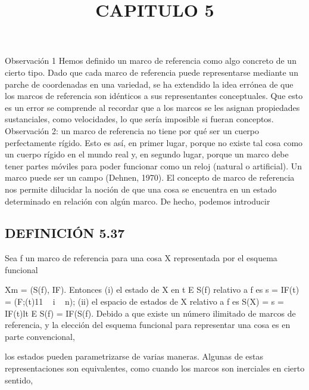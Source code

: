 \begin{justifying}
 \title{
   \begin{center}
    \normalsize CAPITULO 5
    \vspace{0.5cm}
   \end{center}  
  }

  \begin{justifying}
    Observación 1 Hemos definido un marco de referencia como algo concreto de un
cierto tipo. Dado que cada marco de referencia puede representarse mediante un
parche de coordenadas en una variedad, se ha extendido la idea errónea de que
los marcos de referencia son idénticos a sus representantes conceptuales.
Que esto es un error se comprende al recordar que a los marcos se les asignan
propiedades sustanciales, como velocidades, lo que sería imposible si
fueran conceptos. Observación 2: un marco de referencia no tiene por qué ser un
cuerpo perfectamente rígido. Esto es así, en primer lugar, porque no existe tal cosa como un
cuerpo rígido en el mundo real y, en segundo lugar, porque un marco debe tener
partes móviles para poder funcionar como un reloj (natural o artificial). Un
marco puede ser un campo (Dehnen, 1970).
El concepto de marco de referencia nos permite dilucidar la noción de que una
cosa se encuentra en un estado determinado en relación con algún marco. De hecho, podemos
introducir

    \bigskip
    
    \noindent
     \subsection{DEFINICIÓN 5.37}
 Sea f un marco de referencia para una cosa X representada
por el esquema funcional
\bigskip
    
    \noindent 
Xm = (S(f), IF). Entonces
(i) el estado de X en t E S(f) relativo a f es
s = IF(t) = (F;(t)11 ~ i ~ n);
(ii) el espacio de estados de X relativo a f es
S(X) = {s = IF(t)lt E S(f)} = IF(S(f).
\bigskip
Debido a que existe un número ilimitado de marcos de referencia, y la
elección del esquema funcional para representar una cosa es en parte convencional,

los estados pueden parametrizarse de varias maneras. Algunas de estas representaciones
son equivalentes, como cuando los marcos son inerciales en cierto sentido,


\end{justifying}
\end{justifying}
